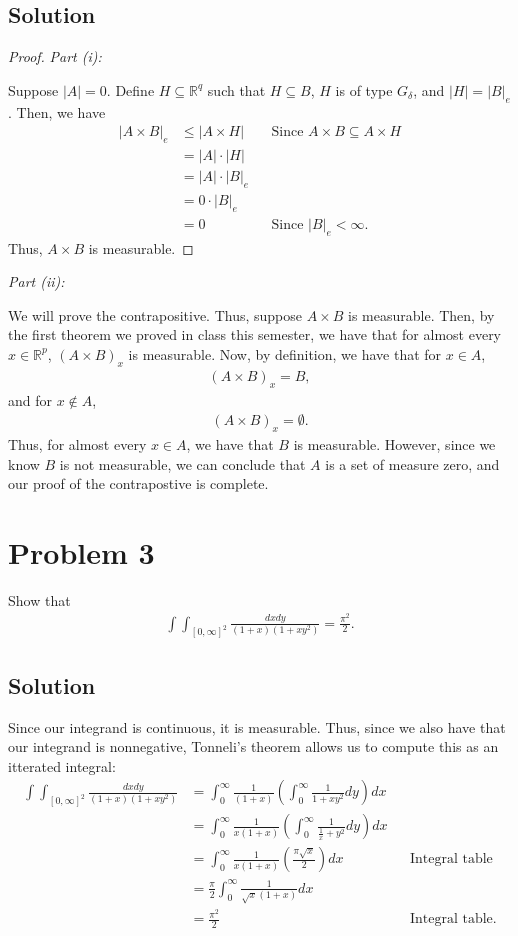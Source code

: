 \documentclass[10pt,a4paper]{article}
\makeatletter
\theoremstyle{theorem}
\newcommand{\proofpart}[2]{%
  \par
  \addvspace{\medskipamount}%
  \noindent\emph{Part #1: #2}\par\nobreak
  \addvspace{\smallskipamount}%
  \@afterheading
}
\theoremstyle{definition}
\makeatother
\begin{document}
\subsection*{Solution}
\begin{proof}
\proofpart{(i)}{} Suppose $|A|=0$. Define $H \subseteq \mathbb{R}^q$ such that $H \subseteq B$, $H$ is of type $G_\delta$, and $|H| = |B|_e$. Then, we have
\begin{align*}
|A \times B|_e &\leq |A \times H| &&\text{Since } A \times B \subseteq A \times H\\
&= |A| \cdot |H|\\
&= |A| \cdot |B|_e\\
&= 0 \cdot |B|_e\\
&= 0 && \text{Since } |B|_e < \infty.
\end{align*}
Thus, $A \times B$ is measurable.
\end{proof}

\proofpart{(ii)}{} We will prove the contrapositive. Thus, suppose $A \times B$ is measurable. Then, by the first theorem we proved in class this semester, we have that for almost every $x \in \mathbb{R}^p$, $(A \times B)_x$ is measurable. Now, by definition, we have that for $x \in A$, 
\begin{align*}
(A \times B)_x = B,
\end{align*} 
and for $x \not \in A$, 
\begin{align*}
(A \times B)_x = \emptyset.
\end{align*}
Thus, for almost every $x \in A$, we have that $B$ is measurable. However, since we know $B$ is not measurable, we can conclude that $A$ is a set of measure zero, and our proof of the contrapostive is complete.

\section*{Problem 3}
Show that
\begin{align*}
\int \int_{[0, \infty]^2} \frac{dx dy}{(1 + x)(1 + x y^2)} = \frac{\pi^2}{2}.
\end{align*}

\subsection*{Solution}
Since our integrand is continuous, it is measurable. Thus, since we also have that our integrand is nonnegative, Tonneli's theorem allows us to compute this as an itterated integral:
\begin{align*}
\int \int_{[0, \infty]^2} \frac{dx dy}{(1 + x)(1 + x y^2)} &= \int_0^\infty \frac{1}{(1 + x)} \left( \int_0^\infty \frac{1}{1 + x y^2} dy \right) dx\\
&= \int_0^\infty \frac{1}{x(1 + x)} \left( \int_0^\infty \frac{1}{\frac{1}{x} + y^2} dy \right) dx\\
&= \int_0^\infty \frac{1}{x(1 + x)} \left( \frac{\pi \sqrt{x}}{2} \right) dx &&\text{Integral table}\\
&= \frac{\pi}{2}\int_0^\infty \frac{1}{\sqrt{x}(1 + x)} dx\\
&= \frac{\pi^2}{2} &&\text{Integral table}.
\end{align*}
\end{document}
